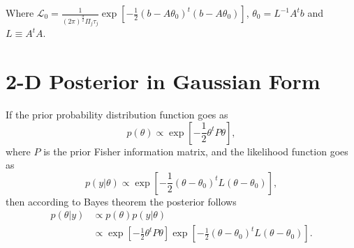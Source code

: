 \documentclass[a4paper,11pt,twoside]{article}
\begin{document}
Where $\mathcal{L}_0 = \frac{1}{(2\pi)^{\frac{d}{2}}\Pi_j\tau_j} \exp\left[-\frac{1}{2}(b - A \theta_0)^t (b - A \theta_0)\right]$, $\theta_0 = L^{-1} A^t b$ and $L \equiv A^tA$.

\section{2-D Posterior in Gaussian Form}
\label{sec:2dposterior}

If the prior probability distribution function goes as
\begin{equation*}
	p(\theta) \propto \exp \left[ -\frac{1}{2} \theta^t P \theta \right],
\end{equation*}
where $P$ is the prior Fisher information matrix, and the likelihood function goes as
\begin{equation*}
	p(y|\theta) \propto \exp\left[-\frac{1}{2} (\theta - \theta_0)^t L (\theta - \theta_0)\right],
\end{equation*}
then according to Bayes theorem the posterior follows
\begin{align*}
	p(\theta|y) & \propto p(\theta) p(y|\theta) 
	\\ & \propto \exp \left[ -\frac{1}{2} \theta^t P \theta \right] \exp\left[-\frac{1}{2} (\theta - \theta_0)^t L (\theta - \theta_0)\right].
\end{align*}
\end{document}
